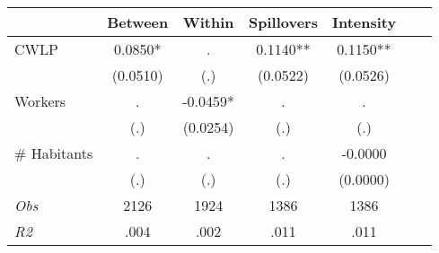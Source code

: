 \begin{tabular}{l*{6}{c}}\hline&\multicolumn{1}{c}{Between}&\multicolumn{1}{c}{Within}&\multicolumn{1}{c}{Spillovers}&\multicolumn{1}{c}{Intensity}\\ \hline 
CWLP & 0.0850* & . & 0.1140** & 0.1150** \\
 & (0.0510) & (.) & (0.0522) & (0.0526) \\
Workers & . & -0.0459* & . & . \\
 & (.) & (0.0254) & (.) & (.) \\
\# Habitants & . & . & . & -0.0000 \\
  & (.) & (.) & (.) & (0.0000) \\
\hline \textit{Obs} & 2126 & 1924 & 1386 & 1386  \\ \textit{R2} & .004 & .002 & .011 & .011 \\ \hline \end{tabular}

